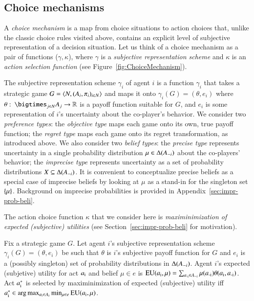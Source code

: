 \documentclass[fleqn,reqno,11pt]{article}
\begin{document}
\subsection{Choice mechanisms}
\label{sec:choice-mechanisms}

A \emph{choice mechanism} is a map from choice situations to action choices that, unlike the
classic choice rules visited above, contains an explicit level of subjective representation of
a decision situation. Let us think of a choice mechanism as a pair of functions
($\gamma,\kappa$), where $\gamma$ is a \emph{subjective representation scheme} and $\kappa$ is
an \emph{action selection function} (see Figure~\ref{fig:ChoiceMechanism}).

The subjective representation scheme $\gamma_i$ of agent $i$ is a function $\gamma_i$ that
takes a strategic game $G = \left \langle  N, (A_i , \pi_i)_{i \in N} \right\rangle$ and maps it onto
$\gamma_i(G) = (\theta, e_i)$ where
$\theta \mycolon \bigtimes_{j \in N} A_j \rightarrow \mathbb{R}$ is a payoff function suitable
for $G$, and $e_i$ is some representation of $i$'s uncertainty about the co-player's
behavior. We consider two \emph{preference types}: the \emph{objective type} maps each game
onto its own, true payoff function; the \emph{regret type} maps each game onto its regret
transformation, as introduced above. We also consider two \emph{belief types}: the
\emph{precise type} represents uncertainty in a single probability distribution
$\mu \in \Delta(A_{-i})$ about the co-players' behavior; the \emph{imprecise type}
represents uncertainty as a set of probability distributions $X \subseteq \Delta(A_{-i})$.
It is convenient to conceptualize precise beliefs as a special case of imprecise beliefs by
looking at $\mu$ as a stand-in for the singleton set $\left\{\mu\right\}$. Background on imprecise
probabilities is provided in Appendix~\ref{sec:impr-prob-beli}.

The action choice function $\kappa$ that we consider here is \emph{maximinimization of expected
  (subjective) utilities} (see Section~\ref{sec:impr-prob-beli} for motivation).

\begin{definition}
  \label{def:maxminSEU}
  Fix a strategic game $G$. Let agent $i$'s subjective representation scheme
  $\gamma_i(G) = (\theta, e_i)$ be such that $\theta$ is $i$'s subjective payoff function for
  $G$ and $e_i$ is a (possibly singleton) set of probability distributions in
  $\Delta(A_{-i})$. Agent $i$'s expected (subjetive) utility for act $a_{\text{i}}$ and belief
  $\mu \in e$ is
  $\operatorname{EU}(a_{\text{i}}, \mu) = \sum_{a_{\text{-i}} \in A_{-i}} \mu(a_{\text{-i}}) \theta(a_{\text{i}},
  a_{\text{-i}})$.
  Act $a_{\text{i}}^*$ is selected by maximinimization of expected (subjective) utility iff
  $a_{\text{i}}^* \in \arg \max_{a_{\text{i}} \in A_{i}} \min_{\mu \in e} \operatorname{EU}(a_{\text{i}}, \mu)$.
\end{definition}
\end{document}
